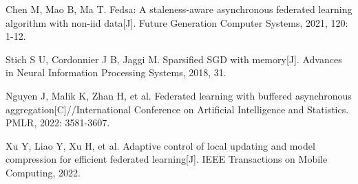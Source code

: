 \documentclass{article}
\begin{document}

\begin{thebibliography}{99}  
 Chen M, Mao B, Ma T. Fedsa: A staleness-aware asynchronous federated learning algorithm with non-iid data[J]. Future Generation Computer Systems, 2021, 120: 1-12.

 Stich S U, Cordonnier J B, Jaggi M. Sparsified SGD with memory[J]. Advances in Neural Information Processing Systems, 2018, 31.

 Nguyen J, Malik K, Zhan H, et al. Federated learning with buffered asynchronous aggregation[C]//International Conference on Artificial Intelligence and Statistics. PMLR, 2022: 3581-3607.

 Xu Y, Liao Y, Xu H, et al. Adaptive control of local updating and model compression for efficient federated learning[J]. IEEE Transactions on Mobile Computing, 2022.

\end{thebibliography}
\end{document}
